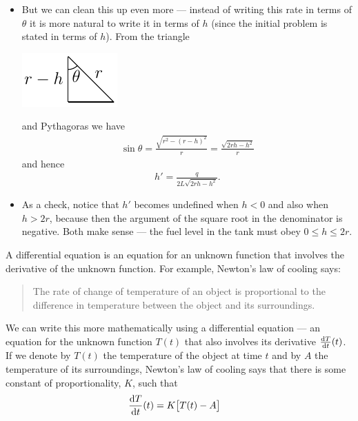 \begin{eg}
\begin{itemize}
\item But we can clean this up even more --- instead of writing this rate in terms of
$\theta$ it is more natural to write it in terms of $h$ (since the initial problem is
stated in terms of $h$). From the triangle
\begin{efig}
\begin{center}
       \includegraphics{fuel6}
\end{center}
\end{efig}
and Pythagoras we have
\begin{align*}
  \sin\theta =\frac{\sqrt{r^2-(r-h)^2}}{r}=\frac{\sqrt{2rh-h^2}}{r}
\end{align*}
and hence
\begin{align*}
  h' = \frac{q}{2L\sqrt{2rh-h^2}}.
\end{align*}

\item As a check, notice that $h'$ becomes undefined when $h<0$ and also when $h>2r$,
because then the argument of the square root in the denominator is negative. Both make
sense --- the fuel level in the tank must obey $0\le h\le 2r$.
\end{itemize}

\end{eg}



\label{sec:ExpGthDecay}
A differential equation is an equation for an unknown function
that involves the derivative of the unknown function. For example,
Newton's law of cooling says:
\begin{quote}
    The rate of change of temperature of an object is proportional
    to the difference in temperature between the object and its
    surroundings.
\end{quote}
We can write this more mathematically using a differential equation --- an equation for
the unknown function $T(t)$ that also involves its derivative $\diff{T}{t}(t)$.
If we denote by $T(t)$ the temperature of the
object at time $t$ and by $A$ the temperature of its surroundings, Newton's law of
cooling says that there is some constant of proportionality,
$K$, such that
\begin{align*}
    \diff{T}{t}(t) &= K\big[T(t)-A\big]
\end{align*}



